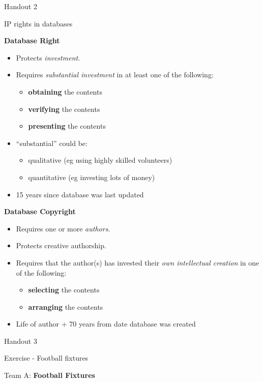 Handout 2

IP rights in databases

\textbf{Database Right }

\begin{itemize}
\item
  Protects \emph{investment}.
\item
  Requires \emph{substantial investment} in at least one of the
  following:

  \begin{itemize}
  \item
    \textbf{obtaining} the contents
  \item
    \textbf{verifying} the contents
  \item
    \textbf{presenting} the contents
  \end{itemize}
\item
  ``substantial'' could be:

  \begin{itemize}
  \item
    qualitative (eg using highly skilled volunteers)
  \item
    quantitative (eg investing lots of money)
  \end{itemize}
\item
  15 years since database was last updated
\end{itemize}

\textbf{Database Copyright}

\begin{itemize}
\item
  Requires one or more \emph{authors}.
\item
  Protects creative authorship.
\item
  Requires that the author(s) has invested their \emph{own intellectual
  creation} in one of the following:

  \begin{itemize}
  \item
    \textbf{selecting} the contents
  \item
    \textbf{arranging} the contents
  \end{itemize}
\item
  Life of author + 70 years from date database was created
\end{itemize}

Handout 3

Exercise - Football fixtures

Team A: \textbf{Football Fixtures}

